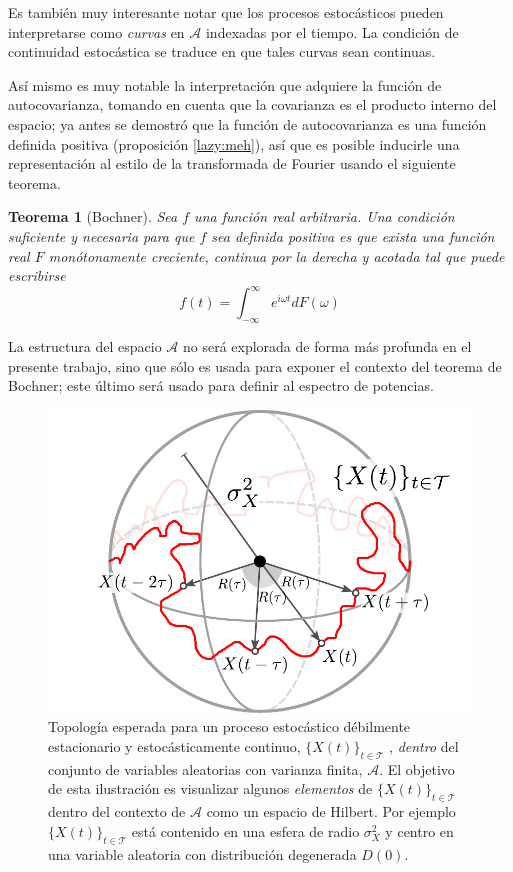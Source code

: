 \documentclass[12pt,letterpaper]{book}
\newtheorem{teorema}{Teorema}[chapter]
\newcommand{\intR}{\int_{-\infty}^{\infty}}
\newcommand{\xt}{$\{X(t)\}_{t\in \mathcal{T}}$ }
\begin{document}
Es también muy interesante notar que los procesos estocásticos pueden interpretarse como \textit{curvas} en $\mathcal{A}$ indexadas por el tiempo.
%
La condición de continuidad estocástica se traduce en que tales curvas sean continuas.

Así mismo es muy notable la interpretación que adquiere la función de autocovarianza, tomando en cuenta que la covarianza es el producto interno del espacio; ya antes se demostró que la función de autocovarianza es una función definida positiva (proposición \ref{lazy:meh}), así que es posible inducirle una representación al estilo de la transformada de Fourier usando el siguiente teorema.

\begin{teorema}[Bochner]
Sea $f$ una función real arbitraria. Una condición suficiente y necesaria para que $f$ sea definida positiva es que exista una función real $F$ monótonamente creciente, continua por la derecha y acotada tal que puede escribirse
\begin{equation}
f(t) = \intR e^{i \omega t} dF(\omega)
\end{equation}
\end{teorema}

La estructura del espacio $\mathcal{A}$ no será explorada de forma más profunda en el presente trabajo, sino que sólo es usada para exponer el contexto del teorema de Bochner; este último será usado para definir al espectro de potencias.

\begin{figure}
\centering
\includegraphics[width=.6\textwidth]{./img_diagramas/esfera_v1.pdf}
\caption[Topología esperada para un proceso estocástico débilmente estacionario y estocásticamente continuo \textit{dentro} del espacio de variables aleatorias con varianza finita.]{Topología esperada para un proceso estocástico débilmente estacionario y estocásticamente continuo, \xt , \textit{dentro} del conjunto de variables aleatorias con varianza finita, $\mathcal{A}$.
%
El objetivo de esta ilustración es visualizar algunos \textit{elementos} de \xt dentro del contexto de $\mathcal{A}$ como un espacio de Hilbert. Por ejemplo \xt está contenido en una esfera de radio $\sigma_X^2$ y centro en una variable aleatoria con distribución degenerada $D(0)$.}
\end{figure}
\end{document}
